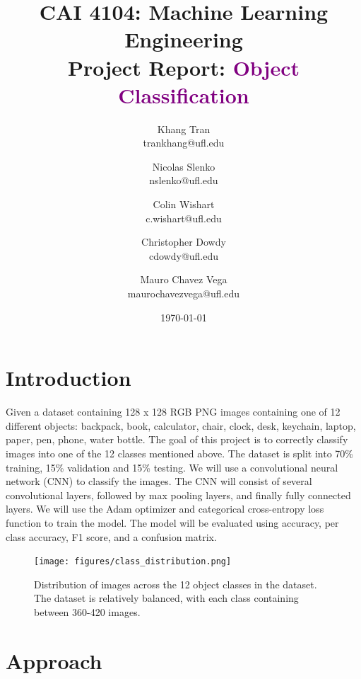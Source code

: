 \documentclass[10pt]{article}
\title{CAI 4104: Machine Learning Engineering\\
	\large Project Report:  {\textcolor{purple}{Object Classification}}} %
\author{
        Khang Tran \\
        trankhang@ufl.edu\\
        \and
        Nicolas Slenko \\
        nslenko@ufl.edu\\
        \and
        Colin Wishart \\
        c.wishart@ufl.edu\\
        \and
        Christopher Dowdy \\
        cdowdy@ufl.edu\\
        \and
        Mauro Chavez Vega \\
        maurochavezvega@ufl.edu\\
}
\date{\today}
\begin{document}

\maketitle






\section{Introduction}

Given a dataset containing 128 x 128 RGB PNG images containing one of 12 different objects: backpack, book, calculator, chair, clock, desk, keychain, laptop, paper, pen, phone, water bottle. The
goal of this project is to correctly classify images into one of the 12 classes mentioned above. The dataset is split into 70\% training, 15\% validation and 15\% testing. We will use a 
convolutional neural network (CNN) to classify the images. The CNN will consist of several convolutional layers, followed by max pooling layers, and finally fully connected layers. 
We will use the Adam optimizer and categorical cross-entropy loss function to train the model. The model will be evaluated using accuracy, per class accuracy, F1 score, and a confusion matrix.

\begin{figure}[H]
    \centering
    \texttt{[image: figures/class\_distribution.png]}
    \caption{Distribution of images across the 12 object classes in the dataset. The dataset is relatively balanced, with each class containing between 360-420 images.}
    \label{fig:class_distribution}
\end{figure}

\section{Approach}
\end{document}
